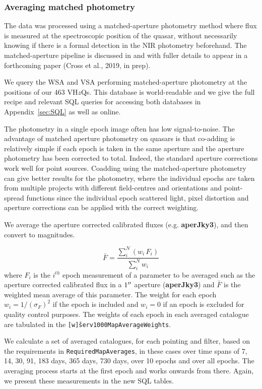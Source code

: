 \documentclass[usenatbib]{mnras}
\begin{document}
  \subsubsection{Averaging matched photometry}
  The data was processed using a matched-aperture photometry method
  where flux is measured at the spectroscopic position of the quasar,
  without necessarily knowing if there is a formal detection in the NIR
  photometry beforehand. The matched-aperture pipeline is discussed in
  \citet{Cross2013} and with fuller details to appear in a forthcoming
  paper (Cross et al., 2019, in prep).
  
  We query the WSA and VSA performing matched-aperture photometry at
  the positions of our 463 VH$z$Qs. This database is world-readable and
  we give the full recipe and relevant SQL queries for accessing both
  databases in Appendix~\ref{sec:SQL} as well as online. 
  
  The photometry in a single epoch image often has low
  signal-to-noise.  The advantage of matched aperture photometry on
  quasars is that co-adding is relatively simple if each epoch is taken
  in the same aperture and the aperture photometry has been corrected to
  total. Indeed, the standard aperture corrections work well for point
  sources. Coadding using the matched-aperture photometry can give better results for the photometry, 
  where the individual epochs are taken from multiple projects with different field-centres and orientations and point-spread functions since the individual epoch scattered light, pixel distortion and aperture corrections can be applied with the correct weighting.
   
  We average the aperture corrected calibrated fluxes (e.g. {\bf
  aperJky3}), and then convert to magnitudes. 

  \begin{equation}
    \bar{F} = \frac{\sum_i^N (w_i\,F_i)}{\sum_i^N w_i}  
    \label{eq:avg}
  \end{equation}
  where $F_i$ is the $i^{th}$ epoch measurement of a parameter to be
  averaged such as the aperture corrected calibrated flux in a $1\hbox{$^{\prime\prime}$}$ aperture
  ({\bf aperJky3}) and $\bar{F}$ is the weighted mean average of this parameter.
  The weight for each epoch $w_i=1/(\sigma_{F})^2$ if the epoch is included and 
  $w_i=0$ if an epoch is excluded for quality control purposes. The weights of each epoch in each averaged catalogue are tabulated in the {\tt [w\v]serv1000MapAverageWeights}.
   
  We calculate a set of averaged catalogues, for each pointing and filter, based
  on the requirements in \verb+RequiredMapAverages+, in these cases over time
  spans of 7, 14, 30, 91, 183 days, 365 days, 730 days, over 10 epochs and
  over all epochs. The averaging process starts at the first epoch and works onwards 
  from there. Again, we present these measurements in the new SQL tables. 
\end{document}
